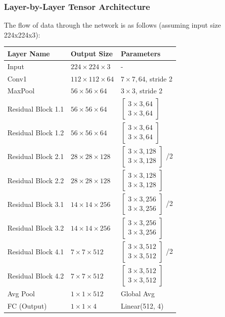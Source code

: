 \documentclass[twocolumn,10pt,a4paper]{article}
\begin{document}
\subsubsection{Layer-by-Layer Tensor Architecture}
The flow of data through the network is as follows (assuming input size 224x224x3):
\begin{longtable}{lll}
\toprule
\textbf{Layer Name} & \textbf{Output Size} & \textbf{Parameters} \\
\midrule
Input & $224 \times 224 \times 3$ & - \\
Conv1 & $112 \times 112 \times 64$ & $7 \times 7, 64$, stride 2 \\
MaxPool & $56 \times 56 \times 64$ & $3 \times 3$, stride 2 \\
Residual Block 1.1 & $56 \times 56 \times 64$ & $\begin{bmatrix} 3 \times 3, 64 \\ 3 \times 3, 64 \end{bmatrix}$ \\
Residual Block 1.2 & $56 \times 56 \times 64$ & $\begin{bmatrix} 3 \times 3, 64 \\ 3 \times 3, 64 \end{bmatrix}$ \\
Residual Block 2.1 & $28 \times 28 \times 128$ & $\begin{bmatrix} 3 \times 3, 128 \\ 3 \times 3, 128 \end{bmatrix}$ /2 \\
Residual Block 2.2 & $28 \times 28 \times 128$ & $\begin{bmatrix} 3 \times 3, 128 \\ 3 \times 3, 128 \end{bmatrix}$ \\
Residual Block 3.1 & $14 \times 14 \times 256$ & $\begin{bmatrix} 3 \times 3, 256 \\ 3 \times 3, 256 \end{bmatrix}$ /2 \\
Residual Block 3.2 & $14 \times 14 \times 256$ & $\begin{bmatrix} 3 \times 3, 256 \\ 3 \times 3, 256 \end{bmatrix}$ \\
Residual Block 4.1 & $7 \times 7 \times 512$ & $\begin{bmatrix} 3 \times 3, 512 \\ 3 \times 3, 512 \end{bmatrix}$ /2 \\
Residual Block 4.2 & $7 \times 7 \times 512$ & $\begin{bmatrix} 3 \times 3, 512 \\ 3 \times 3, 512 \end{bmatrix}$ \\
Avg Pool & $1 \times 1 \times 512$ & Global Avg \\
FC (Output) & $1 \times 1 \times 4$ & Linear(512, 4) \\
\bottomrule
\end{longtable}
\end{document}

